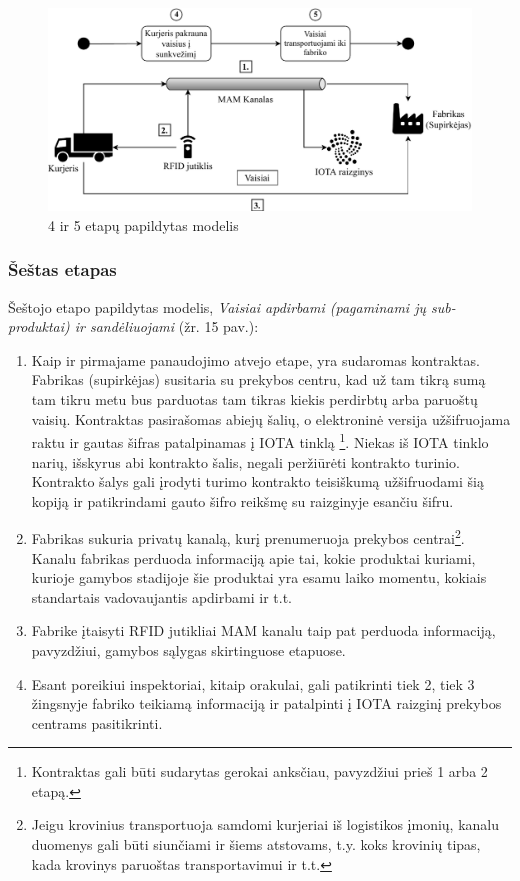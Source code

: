 \begin{figure}[H]
    \centering
    \includegraphics[scale=0.7]{images/iota-usecase-4-5}
    \caption{4 ir 5 etapų papildytas modelis}
\end{figure}




\subsubsection{Šeštas etapas}

Šeštojo etapo papildytas modelis, \textit{Vaisiai apdirbami (pagaminami jų sub-produktai) ir sandėliuojami} (žr. 15 pav.):
\begin{enumerate}
    \item Kaip ir pirmajame panaudojimo atvejo etape, yra sudaromas kontraktas. Fabrikas (supirkėjas) susitaria su prekybos centru, kad už tam tikrą sumą tam tikru metu bus parduotas tam tikras kiekis perdirbtų arba paruoštų vaisių. Kontraktas pasirašomas abiejų šalių, o elektroninė versija užšifruojama raktu ir gautas šifras patalpinamas į IOTA tinklą \footnote{Kontraktas gali būti sudarytas gerokai anksčiau, pavyzdžiui prieš 1 arba 2 etapą.}. Niekas iš IOTA tinklo narių, išskyrus abi kontrakto šalis, negali peržiūrėti kontrakto turinio. Kontrakto šalys gali įrodyti turimo kontrakto teisiškumą užšifruodami šią kopiją ir patikrindami gauto šifro reikšmę su raizginyje esančiu šifru.
    \item Fabrikas sukuria privatų kanalą, kurį prenumeruoja prekybos centrai\footnote{Jeigu krovinius transportuoja samdomi kurjeriai iš logistikos įmonių, kanalu duomenys gali būti siunčiami ir šiems atstovams, t.y. koks krovinių tipas, kada krovinys paruoštas transportavimui ir t.t.}. Kanalu fabrikas perduoda informaciją apie tai, kokie produktai kuriami, kurioje gamybos stadijoje šie produktai yra esamu laiko momentu, kokiais standartais vadovaujantis apdirbami ir t.t.
    \item Fabrike įtaisyti RFID jutikliai MAM kanalu taip pat perduoda informaciją, pavyzdžiui, gamybos sąlygas skirtinguose etapuose.
    \item Esant poreikiui inspektoriai, kitaip orakulai, gali patikrinti tiek 2, tiek 3 žingsnyje fabriko teikiamą informaciją ir patalpinti į IOTA raizginį prekybos centrams pasitikrinti.
\end{enumerate}

